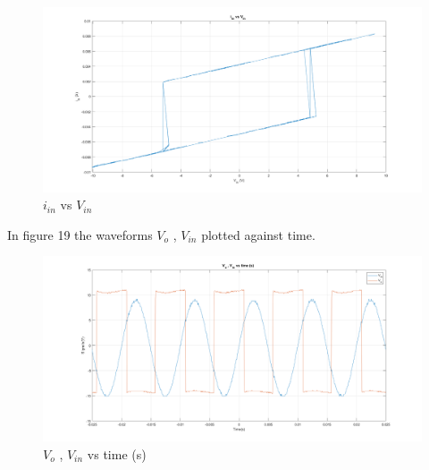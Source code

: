 \documentclass[letterpaper,12pt]{article}
\begin{document}
\begin{figure}[H]
	\centering
   \includegraphics[width=1\textwidth]{3a_1_new.png}
   \caption{\(i_{in}\) vs \(V_{in}\)  }
\end{figure}

In figure 19 the waveforms \(V_{o}\) , \(V_{in}\) plotted against time. 
\begin{figure}[H]
	\centering
   \includegraphics[width=1\textwidth]{3a_2.png}
   \caption{\(V_{o}\) , \(V_{in}\) vs time (s) }
\end{figure}
\end{document}
